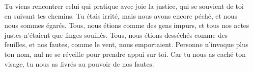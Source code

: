 Tu viens rencontrer celui qui pratique avec joie la justice,
	qui se souvient de toi en suivant tes chemins.
Tu étais irrité,
	mais nous avons encore péché, et nous nous sommes égarés.
Tous, nous étions comme des gens impurs,
	et tous nos actes justes n’étaient que linges souillés.
Tous, nous étions desséchés comme des feuilles,
	et nos fautes, comme le vent, nous emportaient.
Personne n’invoque plus ton nom,
	nul ne se réveille pour prendre appui sur toi.
Car tu nous as caché ton visage,
	tu nous as livrés au pouvoir de nos fautes.
